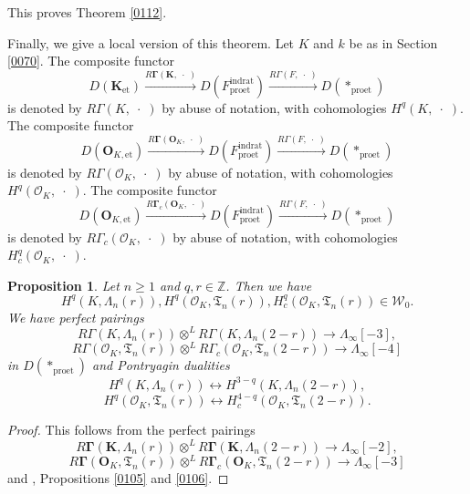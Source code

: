\documentclass{amsart}
\newtheorem{Prop}[Thm]{Proposition}
\theoremstyle{remark}
\numberwithin{equation}{section}
\newcommand{\Order}{\mathcal{O}}
\newcommand{\tensor}{\mathbin{\otimes}}
\newcommand{\Z}{\mathbb{Z}}
\newcommand{\et}{\mathrm{et}}
\newcommand{\rat}{\mathrm{rat}}
\newcommand{\ind}{\mathrm{ind}}
\newcommand{\pro}{\mathrm{pro}}
\newcommand{\alg}[1]{\mathbf{#1}}
\newcommand{\var}{\;\cdot\;}
\begin{document}
This proves Theorem \ref{0112}.

Finally, we give a local version of this theorem.
Let $K$ and $k$ be as in Section \ref{0070}.
The composite functor
	\[
			D(\alg{K}_{\et})
		\stackrel{R \alg{\Gamma}(\alg{K}, \var)}{\longrightarrow}
			D(F^{\ind\rat}_{\pro\et})
		\stackrel{R \Gamma(F, \var)}{\longrightarrow}
			D(\ast_{\pro\et})
	\]
is denoted by $R \Gamma(K, \var)$ by abuse of notation,
with cohomologies $H^{q}(K, \var)$.
The composite functor
	\[
			D(\alg{O}_{K, \et})
		\stackrel{R \alg{\Gamma}(\alg{O}_{K}, \var)}{\longrightarrow}
			D(F^{\ind\rat}_{\pro\et})
		\stackrel{R \Gamma(F, \var)}{\longrightarrow}
			D(\ast_{\pro\et})
	\]
is denoted by $R \Gamma(\Order_{K}, \var)$ by abuse of notation,
with cohomologies $H^{q}(\Order_{K}, \var)$.
The composite functor
	\[
			D(\alg{O}_{K, \et})
		\stackrel{R \alg{\Gamma}_{c}(\alg{O}_{K}, \var)}{\longrightarrow}
			D(F^{\ind\rat}_{\pro\et})
		\stackrel{R \Gamma(F, \var)}{\longrightarrow}
			D(\ast_{\pro\et})
	\]
is denoted by $R \Gamma_{c}(\Order_{K}, \var)$ by abuse of notation,
with cohomologies $H^{q}_{c}(\Order_{K}, \var)$.

\begin{Prop}
	Let $n \ge 1$ and $q, r \in \Z$.
	Then we have
		\[
				H^{q}(K, \Lambda_{n}(r)),
				H^{q}(\Order_{K}, \mathfrak{T}_{n}(r)),
				H^{q}_{c}(\Order_{K}, \mathfrak{T}_{n}(r))
			\in
				\mathcal{W}_{0}.
		\]
	We have perfect pairings
		\[
					R \Gamma(K, \Lambda_{n}(r))
				\tensor^{L}
					R \Gamma(K, \Lambda_{n}(2 - r))
			\to
				\Lambda_{\infty}[-3],
		\]
		\[
					R \Gamma(\Order_{K}, \mathfrak{T}_{n}(r))
				\tensor^{L}
					R \Gamma_{c}(\Order_{K}, \mathfrak{T}_{n}(2 - r))
			\to
				\Lambda_{\infty}[-4]
		\]
	in $D(\ast_{\pro\et})$ and Pontryagin dualities
		\[
				H^{q}(K, \Lambda_{n}(r))
			\leftrightarrow
				H^{3 - q}(K, \Lambda_{n}(2 - r)),
		\]
		\[
				H^{q}(\Order_{K}, \mathfrak{T}_{n}(r))
			\leftrightarrow
				H^{4 - q}_{c}(\Order_{K}, \mathfrak{T}_{n}(2 - r)).
		\]
\end{Prop}

\begin{proof}
	This follows from the perfect pairings
		\[
					R \alg{\Gamma}(\alg{K}, \Lambda_{n}(r))
				\tensor^{L}
					R \alg{\Gamma}(\alg{K}, \Lambda_{n}(2 - r))
			\to
				\Lambda_{\infty}[-2],
		\]
		\[
					R \alg{\Gamma}(\alg{O}_{K}, \mathfrak{T}_{n}(r))
				\tensor^{L}
					R \alg{\Gamma}_{c}(\alg{O}_{K}, \mathfrak{T}_{n}(2 - r))
			\to
				\Lambda_{\infty}[-3]
		\]
	and \cite[Proposition 4.2.1]{SuzCurve},
	Propositions \ref{0105} and \ref{0106}.
\end{proof}
\end{document}
